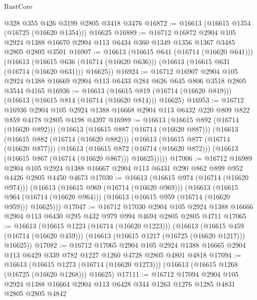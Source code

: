 \begin{lexlean}{RustCore}
\begin{coremodule}
    @328
    @355
    @426
    @3199
    @2805
    @3418
    @3476
@16872 := @16613 (@16615 @1354 (@16725 (@16620 @1354))) @16625
@16889 := @16712
    @16872
    @2904
    @105
    @2924
    @1388
    @16670
    @2904
    @113
    @6434
    @360
    @1349
    @1356
    @1367
    @3485
    @2805
    @2805
    @3501
@16907 := @16613
    (@16615 @641 (@16714 (@16620 @641)))
    (@16613
      (@16615 @636 (@16714 (@16620 @636)))
      (@16613 (@16615 @631 (@16714 (@16620 @631))) @16625))
@16924 := @16712
    @16907
    @2904
    @105
    @2924
    @1388
    @16669
    @2904
    @113
    @6433
    @284
    @626
    @645
    @806
    @3518
    @2805
    @3544
    @4165
@16936 := @16613
    (@16615 @819 (@16714 (@16620 @819)))
    (@16613 (@16615 @814 (@16714 (@16620 @814))) @16625)
@16953 := @16712
    @16936
    @2904
    @105
    @2924
    @1388
    @16668
    @2904
    @113
    @6432
    @220
    @809
    @822
    @859
    @4178
    @2805
    @4198
    @4397
@16989 := @16613
    (@16615 @892 (@16714 (@16620 @892)))
    (@16613
      (@16615 @887 (@16714 (@16620 @887)))
      (@16613
        (@16615 @882 (@16714 (@16620 @882)))
        (@16613
          (@16615 @877 (@16714 (@16620 @877)))
          (@16613
            (@16615 @872 (@16714 (@16620 @872)))
            (@16613 (@16615 @867 (@16714 (@16620 @867))) @16625)))))
@17006 := @16712
    @16989
    @2904
    @105
    @2924
    @1388
    @16667
    @2904
    @113
    @6431
    @290
    @862
    @899
    @952
    @4426
    @2805
    @4450
    @4673
@17030 := @16613
    (@16615 @974 (@16714 (@16620 @974)))
    (@16613
      (@16615 @969 (@16714 (@16620 @969)))
      (@16613
        (@16615 @964 (@16714 (@16620 @964)))
        (@16613 (@16615 @959 (@16714 (@16620 @959))) @16625)))
@17047 := @16712
    @17030
    @2904
    @105
    @2924
    @1388
    @16666
    @2904
    @113
    @6430
    @295
    @432
    @979
    @994
    @4694
    @2805
    @2805
    @4711
@17065 := @16613
    (@16615 @1223 (@16714 (@16620 @1223)))
    (@16613
      (@16615 @459 (@16714 (@16620 @459)))
      (@16613 (@16615 @1217 (@16725 (@16620 @1217))) @16625))
@17082 := @16712
    @17065
    @2904
    @105
    @2924
    @1388
    @16665
    @2904
    @113
    @6429
    @339
    @782
    @1227
    @1260
    @4728
    @2805
    @4801
    @4818
@17094 := @16613
    (@16615 @1273 (@16714 (@16620 @1273)))
    (@16613 (@16615 @1268 (@16725 (@16620 @1268))) @16625)
@17111 := @16712
    @17094
    @2904
    @105
    @2924
    @1388
    @16664
    @2904
    @113
    @6428
    @344
    @1263
    @1276
    @1285
    @4831
    @2805
    @2805
    @4842

\end{coremodule}
\end{lexlean}
